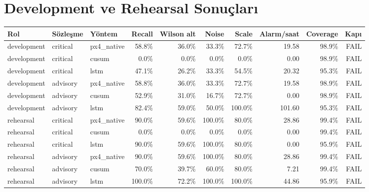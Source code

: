 \documentclass[11pt,a4paper]{article}
\begin{document}
\section{Development ve Rehearsal Sonuçları}
\small
\begin{longtable}{lllrrrrrrr}
\toprule
Rol & Sözleşme & Yöntem & Recall & Wilson alt & Noise & Scale & Alarm/saat & Coverage & Kapı \\
\midrule
\endhead
development & critical & px4\_native & 58.8\% & 36.0\% & 33.3\% & 72.7\% & 19.58 & 98.9\% & FAIL \\
development & critical & cusum & 0.0\% & 0.0\% & 0.0\% & 0.0\% & 0.00 & 98.9\% & FAIL \\
development & critical & lstm & 47.1\% & 26.2\% & 33.3\% & 54.5\% & 20.32 & 95.3\% & FAIL \\
development & advisory & px4\_native & 58.8\% & 36.0\% & 33.3\% & 72.7\% & 19.58 & 98.9\% & FAIL \\
development & advisory & cusum & 52.9\% & 31.0\% & 16.7\% & 72.7\% & 0.00 & 98.9\% & FAIL \\
development & advisory & lstm & 82.4\% & 59.0\% & 50.0\% & 100.0\% & 101.60 & 95.3\% & FAIL \\
rehearsal & critical & px4\_native & 90.0\% & 59.6\% & 100.0\% & 80.0\% & 28.86 & 99.4\% & FAIL \\
rehearsal & critical & cusum & 0.0\% & 0.0\% & 0.0\% & 0.0\% & 0.00 & 99.4\% & FAIL \\
rehearsal & critical & lstm & 90.0\% & 59.6\% & 100.0\% & 80.0\% & 0.00 & 95.9\% & FAIL \\
rehearsal & advisory & px4\_native & 90.0\% & 59.6\% & 100.0\% & 80.0\% & 28.86 & 99.4\% & FAIL \\
rehearsal & advisory & cusum & 70.0\% & 39.7\% & 60.0\% & 80.0\% & 7.21 & 99.4\% & FAIL \\
rehearsal & advisory & lstm & 100.0\% & 72.2\% & 100.0\% & 100.0\% & 44.86 & 95.9\% & FAIL \\
\bottomrule
\end{longtable}
\normalsize
\end{document}
